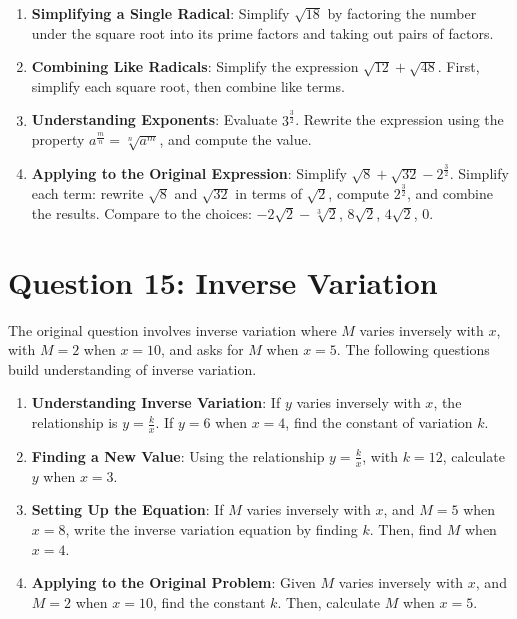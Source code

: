 \documentclass[12pt]{article}
\begin{document}
\begin{enumerate}[label=14.\arabic*]
    \item \textbf{Simplifying a Single Radical}: Simplify \( \sqrt{18} \) by factoring the number under the square root into its prime factors and taking out pairs of factors.
    \item \textbf{Combining Like Radicals}: Simplify the expression \( \sqrt{12} + \sqrt{48} \). First, simplify each square root, then combine like terms.
    \item \textbf{Understanding Exponents}: Evaluate \( 3^{\frac{3}{2}} \). Rewrite the expression using the property \( a^{\frac{m}{n}} = \sqrt[n]{a^m} \), and compute the value.
    \item \textbf{Applying to the Original Expression}: Simplify \( \sqrt{8} + \sqrt{32} - 2^{\frac{3}{2}} \). Simplify each term: rewrite \( \sqrt{8} \) and \( \sqrt{32} \) in terms of \( \sqrt{2} \), compute \( 2^{\frac{3}{2}} \), and combine the results. Compare to the choices: \( -2\sqrt{2} - \sqrt[3]{2} \), \( 8\sqrt{2} \), \( 4\sqrt{2} \), 0.
\end{enumerate}

\section*{Question 15: Inverse Variation}
The original question involves inverse variation where \( M \) varies inversely with \( x \), with \( M = 2 \) when \( x = 10 \), and asks for \( M \) when \( x = 5 \). The following questions build understanding of inverse variation.

\begin{enumerate}[label=15.\arabic*]
    \item \textbf{Understanding Inverse Variation}: If \( y \) varies inversely with \( x \), the relationship is \( y = \frac{k}{x} \). If \( y = 6 \) when \( x = 4 \), find the constant of variation \( k \).
    \item \textbf{Finding a New Value}: Using the relationship \( y = \frac{k}{x} \), with \( k = 12 \), calculate \( y \) when \( x = 3 \).
    \item \textbf{Setting Up the Equation}: If \( M \) varies inversely with \( x \), and \( M = 5 \) when \( x = 8 \), write the inverse variation equation by finding \( k \). Then, find \( M \) when \( x = 4 \).
    \item \textbf{Applying to the Original Problem}: Given \( M \) varies inversely with \( x \), and \( M = 2 \) when \( x = 10 \), find the constant \( k \). Then, calculate \( M \) when \( x = 5 \).
\end{enumerate}
\end{document}
